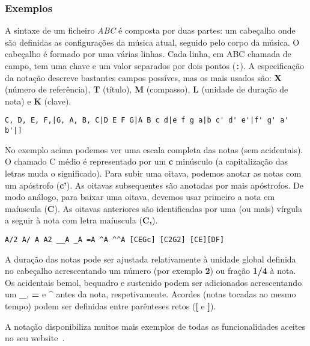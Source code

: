    \subsubsection{Exemplos}
A sintaxe de um ficheiro \textit{ABC} é composta por duas partes: um cabeçalho onde são definidas as configurações da música atual, seguido pelo corpo da música. O cabeçalho é formado por uma várias linhas. Cada linha, em ABC chamada de campo, tem uma chave e um valor separados por dois pontos (\texttt{:}). A especificação da notação descreve bastantes campos possíves, mas os mais usados são: \textbf{X} (número de referência), \textbf{T} (título), \textbf{M} (compasso), \textbf{L} (unidade de duração de nota) e \textbf{K} (clave).

\begin{lstlisting}[caption={Exemplo da notação ABC},captionpos=b,backgroundcolor=\color{softgray},rulecolor=\color{white},framesep=6pt]
C, D, E, F,|G, A, B, C|D E F G|A B c d|e f g a|b c' d' e'|f' g' a' b'|]
\end{lstlisting}

No exemplo acima podemos ver uma escala completa das notas (sem acidentais). O chamado C médio é representado por um \textbf{c} minúsculo (a capitalização das letras muda o significado). Para subir uma oitava, podemos anotar as notas com um apóstrofo (\textbf{c'}). As oitavas subsequentes são anotadas por mais apóstrofos. De modo análogo, para baixar uma oitava, devemos usar primeiro a nota em maíuscula (\textbf{C}). As oitavas anteriores são identificadas por uma (ou mais) vírgula a seguir à nota com letra maíuscula (\textbf{C,}).


\begin{lstlisting}[caption={Exemplo da notação ABC},captionpos=b,backgroundcolor=\color{softgray},rulecolor=\color{white},framesep=6pt]
A/2 A/ A A2 __A _A =A ^A ^^A [CEGc] [C2G2] [CE][DF]
\end{lstlisting}
A duração das notas pode ser ajustada relativamente à unidade global definida no cabeçalho acrescentando um número (por exemplo \textbf{2}) ou fração \textbf{1/4} à nota. Os acidentais bemol, bequadro e sustenido podem ser adicionados acrescentando um \textbf{\_}, \textbf{=} e \textbf{\^} antes da nota, respetivamente. Acordes (notas tocadas ao mesmo tempo) podem ser definidas entre parênteses retos (\textbf{[} e \textbf{]}).

A notação disponibiliza muitos mais exemplos de todas as funcionalidades aceites no seu website~\cite{abc-notation-examples}.


